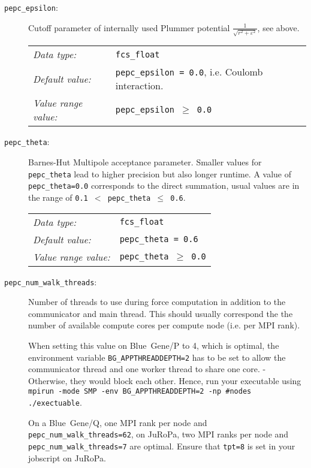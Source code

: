 \begin{description}
  \item[\texttt{pepc\_epsilon}:] Cutoff parameter of internally used Plummer potential 
	$\frac{1}{\sqrt{r^2+\varepsilon^2}}$, see above.
	
	\begin{tabular}{ll}
	   \textit{Data type:}         & \texttt{fcs\_float} \\
	   \textit{Default value:}     & \texttt{pepc\_epsilon = 0.0}, i.e. Coulomb interaction. \\
	   \textit{Value range value:} & \texttt{pepc\_epsilon $\geq$ 0.0}
	\end{tabular}

  \item[\texttt{pepc\_theta}:] Barnes-Hut Multipole acceptance parameter. Smaller values for 
	\texttt{pepc\_theta} lead to higher precision but also longer runtime. A value of
	\texttt{pepc\_theta=0.0} corresponds to the direct  summation, usual values 
	are in the range of \texttt{0.1 $<$ pepc\_theta $\leq$ 0.6}.

	\begin{tabular}{ll}
	   \textit{Data type:}         & \texttt{fcs\_float} \\
	   \textit{Default value:}     & \texttt{pepc\_theta = 0.6} \\
	   \textit{Value range value:} & \texttt{pepc\_theta $\geq$ 0.0}
	\end{tabular}


  \item[\texttt{pepc\_num\_walk\_threads}:] Number of threads to use during force computation in 
	addition to the communicator and main thread. This should usually correspond the the number of
	available compute cores per compute node (i.e. per MPI rank).

	When setting this value on Blue~Gene/P to 4, which is optimal, the environment variable
	\texttt{BG\_APPTHREADDEPTH=2} has to be set to allow the communicator thread and one worker
	thread to share one core. - Otherwise, they would block each other. Hence, run your 
	executable using \texttt{mpirun -mode SMP -env BG\_APPTHREADDEPTH=2 -np \#nodes ./exectuable}.
    
    On a Blue~Gene/Q, one MPI rank per node and \texttt{pepc\_num\_walk\_threads=62},
    on JuRoPa, two MPI ranks per node and \texttt{pepc\_num\_walk\_threads=7} are optimal.
    Ensure that \texttt{tpt=8} is set in your jobscript on JuRoPa.


\end{description}
